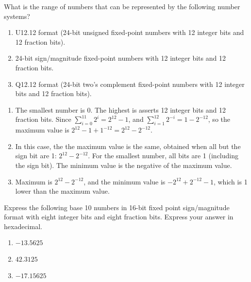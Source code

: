 \documentclass[12pt]{article}
\newenvironment{ex}[2][Exercise]{\begin{trivlist}
		\item[\hskip \labelsep {\bfseries #1}\hskip \labelsep {\bfseries #2.}]}{\end{trivlist}}
\newenvironment{sol}[1][Solution]{\begin{trivlist}
		\item[\hskip \labelsep {\bfseries #1:}]}{\end{trivlist}}
\begin{document}
\begin{ex}{5.32}
	What is the range of numbers that can be represented by the following number
	systems?
	\begin{enumerate}[label=(\alph*)]
		\item U12.12 format (24-bit unsigned fixed-point numbers with 12 integer
		bits and 12 fraction bits).
		\item 24-bit sign/magnitude fixed-point numbers with 12 integer bits and
		12 fraction bits.
		\item Q12.12 format (24-bit two's complement fixed-point numbers with 12
		integer bits and 12 fraction bits).
	\end{enumerate}
\end{ex}

\begin{sol}
	\begin{enumerate}[label=(\alph*)]
		\item The smallest number is 0. The highest is asserts 12 integer bits and 12 fraction bits.
		Since $\sum_{i=0}^{11}2^i=2^{12}-1$, and $\sum_{i=1}^{12}2^{-i}=1-2^{-12}$,
		so the maximum value is $2^{12}-1+1^{-12}=2^{12}-2^{-12}$.
		\item In this case, the the maximum value is the same, obtained when all but the sign bit
		are 1: $2^{12}-2^{-12}$. For the smallest number, all bits are 1 (including the sign bit).
		The minimum value is the negative of the maximum value.
		\item Maximum is $2^{12}-2^{-12}$, and the minimum value is $-2^{12}+2^{-12}-1$, which is
		1 lower than the maximum value.
	\end{enumerate}
\end{sol}

\begin{ex}{5.33}
	Express the following base 10 numbers in 16-bit fixed point sign/magnitude
	format with eight integer bits and eight fraction bits. Express your
	answer in hexadecimal.
	\begin{enumerate}[label=(\alph*)]
		\item $-13.5625$
		\item $42.3125$
		\item $-17.15625$
	\end{enumerate}
\end{ex}
\end{document}

